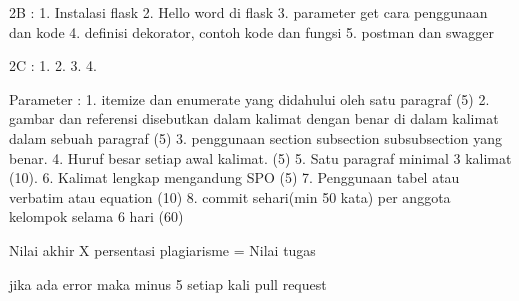 2B :
1. Instalasi flask
2. Hello word di flask
3. parameter get cara penggunaan dan kode
4. definisi dekorator, contoh kode dan fungsi
5. postman dan swagger

2C :
1. 
2. 
3. 
4. 



Parameter :
1. itemize dan enumerate yang didahului oleh satu paragraf (5)
2. gambar dan referensi disebutkan dalam kalimat dengan benar di dalam kalimat dalam sebuah paragraf (5)
3. penggunaan section subsection subsubsection yang benar. 
4. Huruf besar setiap awal kalimat. (5)
5. Satu paragraf minimal 3 kalimat (10).
6. Kalimat lengkap mengandung SPO (5)
7. Penggunaan tabel atau verbatim atau equation (10)
8. commit sehari(min 50 kata) per anggota kelompok selama 6 hari (60)

Nilai akhir X persentasi plagiarisme = Nilai tugas


jika ada error maka minus 5 setiap kali pull request